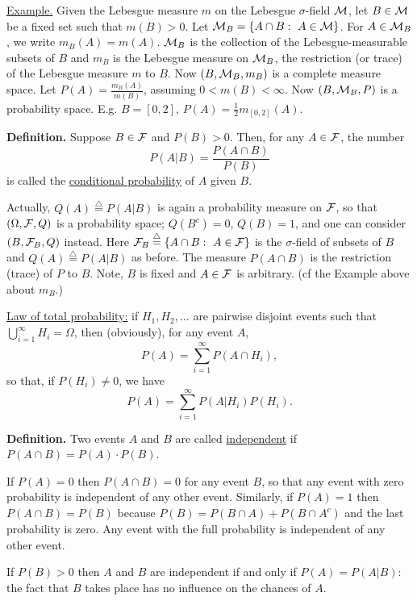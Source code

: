 \documentclass[a4paper,10pt]{article}
\newcommand{\1}[1]{\mathbf{1}_{\{#1\}}}
\newcommand{\defi}{\stackrel{\triangle}{=}}
\begin{document}
\underline{Example.} Given the Lebesgue measure $m$ on the Lebesgue $\sigma$-field $\cal M$, let $B\in{\cal M}$ be a fixed set such that $m(B)>0$. Let ${\cal M}_B=\{A\cap B:~A\in{\cal M}\}$. For $A\in{\cal M}_B$, we write $m_B(A)=m(A)$. ${\cal M}_B$ is the collection of the Lebesgue-measurable subsets of $B$ and $m_B$ is the Lebesgue measure on ${\cal M}_B$, the restriction (or trace) of the Lebesgue measure $m$ to $B$. Now $(B,{\cal M}_B,m_B)$ is a complete measure space. Let $P(A)=\frac{m_B(A)}{m(B)}$, assuming $0<m(B)<\infty$. Now $(B,{\cal M}_B,P)$ is a probability space. E.g. $B=[0,2]$, $P(A)=\frac{1}{2} m_{[0,2]}(A)$. \vspace{3mm}

{\bf Definition.} Suppose $B\in{\cal F}$ and $P(B)>0$. Then, for any $A\in{\cal F}$, the number
  $$P(A|B)=\frac{P(A\cap B)}{P(B)}$$
is called the \underline{conditional probability} of $A$ given $B$.\vspace{3mm}

Actually, $Q(A)\defi P(A|B)$ is again a probability measure on $\cal F$, so that $(\Omega,{\cal F},Q)$ is a probability space; $Q(B^c)=0$, $Q(B)=1$, and one can consider $(B,{\cal F}_B,Q)$ instead. Here ${\cal F}_B\defi \{A\cap B:~A\in{\cal F}\}$ is the $\sigma$-field of subsets of $B$ and $Q(A)\defi P(A|B)$ as before.  The measure $P(A\cap B)$ is the restriction (trace) of $P$ to $B$. Note, $B$ is fixed and $A\in{\cal F}$ is arbitrary. (cf the Example above about $m_B$.) \vspace{5mm}

\underline{Law of total probability:} if $H_1,H_2,\ldots$ are pairwise disjoint events such that $\displaystyle \bigcup_{i=1}^\infty H_i=\Omega$, then (obviously), for any event $A$,
  $$P(A)=\sum_{i=1}^\infty P(A\cap H_i),$$
so that, if $P(H_i)\ne 0$, we have
  $$P(A)=\sum_{i=1}^\infty P(A|H_i)P(H_i).$$ \vspace{3mm}

{\bf Definition.} Two events $A$ and $B$ are called \underline{independent} if $P(A\cap B)=P(A)\cdot P(B)$.\vspace{3mm}

If $P(A)=0$ then $P(A\cap B)=0$ for any event $B$, so that any event with zero probability is independent of any other event. Similarly, if $P(A)=1$ then $P(A\cap B)=P(B)$ because $P(B)=P(B\cap A)+P(B\cap A^c)$ and the last probability is zero. Any event with the full probability is independent of any other event.

If $P(B)>0$ then $A$ and $B$ are independent if and only if $P(A)=P(A|B)$: the fact that $B$ takes place has no influence on the chances of $A$.\vspace{3mm}
\end{document}
